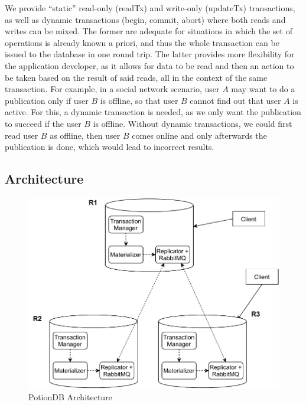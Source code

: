 \documentclass{vldb}
\newcommand{\code}[1]{\textsf{\small{#1}}}
\begin{document}
We provide ``static'' read-only (\code{readTx}) and write-only (\code{updateTx}) transactions, 
as well as dynamic transactions (\code{begin}, \code{commit}, \code{abort}) where both reads and writes can be mixed.
The former are adequate for situations in which the set of operations is already known a priori, and thus the whole transaction can be issued to the database in one round trip.
The latter provides more flexibility for the application developer, as it allows for data to be read and then an action to be taken based on the result of said reads, all in the context of the same transaction.
For example, in a social network scenario, user $A$ may want to do a publication only if user $B$ is offline, so that user $B$ cannot find out that user $A$ is active.
For this, a dynamic transaction is needed, as we only want the publication to succeed if the user $B$ is offline.
Without dynamic transactions, we could first read user $B$ as offline, then user $B$ comes online and only afterwards the publication is done, which would lead to incorrect results.

\subsection{Architecture}
\label{subsec:architecture}


\begin{figure}
	\centering
	\includegraphics[width=.95\linewidth]{potiondb_architecture}
	\caption{PotionDB Architecture}
	\label{fig:arch}
\end{figure}
\end{document}
